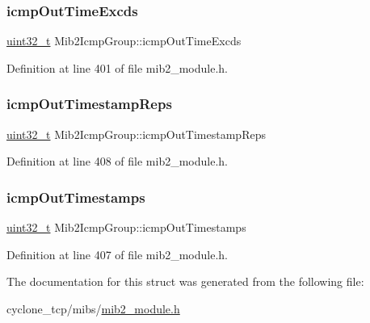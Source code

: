 \subsubsection{\texorpdfstring{icmp\+Out\+Time\+Excds}{icmpOutTimeExcds}}
{\footnotesize\ttfamily \hyperlink{stdint_8h_a435d1572bf3f880d55459d9805097f62}{uint32\+\_\+t} Mib2\+Icmp\+Group\+::icmp\+Out\+Time\+Excds}



Definition at line 401 of file mib2\+\_\+module.\+h.

\mbox{\label{structMib2IcmpGroup_a7433975731582f0c52598b6b9a9d6294}} 
\subsubsection{\texorpdfstring{icmp\+Out\+Timestamp\+Reps}{icmpOutTimestampReps}}
{\footnotesize\ttfamily \hyperlink{stdint_8h_a435d1572bf3f880d55459d9805097f62}{uint32\+\_\+t} Mib2\+Icmp\+Group\+::icmp\+Out\+Timestamp\+Reps}



Definition at line 408 of file mib2\+\_\+module.\+h.

\mbox{\label{structMib2IcmpGroup_ab64f8273aef3f1aa8fb0da7a11fb3997}} 
\subsubsection{\texorpdfstring{icmp\+Out\+Timestamps}{icmpOutTimestamps}}
{\footnotesize\ttfamily \hyperlink{stdint_8h_a435d1572bf3f880d55459d9805097f62}{uint32\+\_\+t} Mib2\+Icmp\+Group\+::icmp\+Out\+Timestamps}



Definition at line 407 of file mib2\+\_\+module.\+h.



The documentation for this struct was generated from the following file\+:\begin{DoxyCompactItemize}
\item 
cyclone\+\_\+tcp/mibs/\hyperlink{mib2__module_8h}{mib2\+\_\+module.\+h}\end{DoxyCompactItemize}
